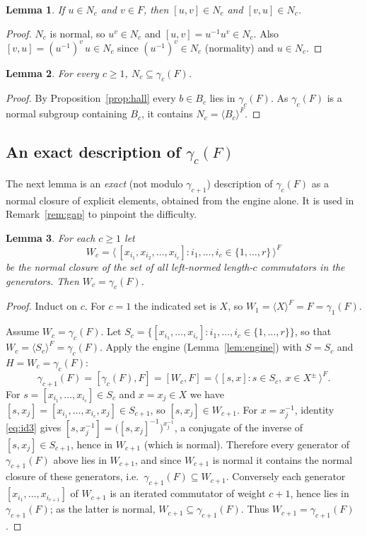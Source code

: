 \documentclass{amsart}
\newtheorem{lemma}{Lemma}
\theoremstyle{definition}
\theoremstyle{remark}
\begin{document}
\begin{lemma}\label{lem:caseA}
If $u\in N_c$ and $v\in F$, then $[u,v]\in N_c$ and $[v,u]\in N_c$.
\end{lemma}

\begin{proof}
$N_c$ is normal, so $u^{v}\in N_c$ and $[u,v]=u^{-1}u^{v}\in N_c$. Also
$[v,u]=(u^{-1})^{v}\,u\in N_c$ since $(u^{-1})^{v}\in N_c$ (normality) and
$u\in N_c$.
\end{proof}

\begin{lemma}\label{lem:easy}
For every $c\ge1$, $N_c\subseteq\gamma_c(F)$.
\end{lemma}

\begin{proof}
By Proposition~\ref{prop:hall} every $b\in B_c$ lies in $\gamma_c(F)$. As
$\gamma_c(F)$ is a normal subgroup containing $B_c$, it contains
$N_c=\langle B_c\rangle^{F}$.
\end{proof}

\subsection*{An exact description of $\gamma_c(F)$}

The next lemma is an \emph{exact} (not modulo $\gamma_{c+1}$) description of
$\gamma_c(F)$ as a normal closure of explicit elements, obtained from the engine
alone. It is used in Remark~\ref{rem:gap} to pinpoint the difficulty.

\begin{lemma}\label{lem:Wc}
For each $c\ge 1$ let
\[
W_c=\big\langle\,[x_{i_1},x_{i_2},\dots,x_{i_c}] : i_1,\dots,i_c\in\{1,\dots,r\}\,\big\rangle^{F}
\]
be the normal closure of the set of all left-normed length-$c$ commutators in the
generators. Then $W_c=\gamma_c(F)$.
\end{lemma}

\begin{proof}
Induct on $c$. For $c=1$ the indicated set is $X$, so $W_1=\langle X\rangle^F=F=\gamma_1(F)$.

Assume $W_c=\gamma_c(F)$. Let
$S_c=\{[x_{i_1},\dots,x_{i_c}]:i_1,\dots,i_c\in\{1,\dots,r\}\}$, so that
$W_c=\langle S_c\rangle^{F}=\gamma_c(F)$. Apply the engine
(Lemma~\ref{lem:engine}) with $S=S_c$ and $H=W_c=\gamma_c(F)$:
\[
\gamma_{c+1}(F)=[\gamma_c(F),F]=[W_c,F]
=\big\langle\,[s,x] : s\in S_c,\ x\in X^{\pm}\,\big\rangle^{F}.
\]
For $s=[x_{i_1},\dots,x_{i_c}]\in S_c$ and $x=x_j\in X$ we have
$[s,x_j]=[x_{i_1},\dots,x_{i_c},x_j]\in S_{c+1}$, so $[s,x_j]\in W_{c+1}$. For
$x=x_j^{-1}$, identity \eqref{eq:id3} gives
$[s,x_j^{-1}]=\big([s,x_j]^{-1}\big)^{x_j^{-1}}$, a conjugate of the inverse of
$[s,x_j]\in S_{c+1}$, hence in $W_{c+1}$ (which is normal). Therefore every
generator of $\gamma_{c+1}(F)$ above lies in $W_{c+1}$, and since $W_{c+1}$ is
normal it contains the normal closure of these generators, i.e.\
$\gamma_{c+1}(F)\subseteq W_{c+1}$. Conversely each generator
$[x_{i_1},\dots,x_{i_{c+1}}]$ of $W_{c+1}$ is an iterated commutator of weight
$c+1$, hence lies in $\gamma_{c+1}(F)$; as the latter is normal,
$W_{c+1}\subseteq\gamma_{c+1}(F)$. Thus $W_{c+1}=\gamma_{c+1}(F)$.
\end{proof}
\end{document}
